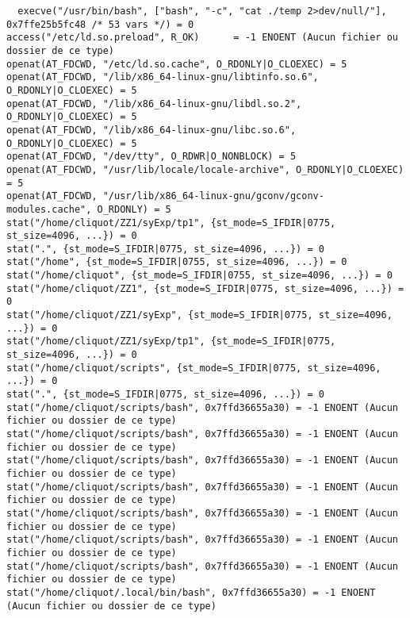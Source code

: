 \documentclass[11pt]{article}
\begin{document}
\begin{lstlisting}
  execve("/usr/bin/bash", ["bash", "-c", "cat ./temp 2>dev/null/"], 0x7ffe25b5fc48 /* 53 vars */) = 0
access("/etc/ld.so.preload", R_OK)      = -1 ENOENT (Aucun fichier ou dossier de ce type)
openat(AT_FDCWD, "/etc/ld.so.cache", O_RDONLY|O_CLOEXEC) = 5
openat(AT_FDCWD, "/lib/x86_64-linux-gnu/libtinfo.so.6", O_RDONLY|O_CLOEXEC) = 5
openat(AT_FDCWD, "/lib/x86_64-linux-gnu/libdl.so.2", O_RDONLY|O_CLOEXEC) = 5
openat(AT_FDCWD, "/lib/x86_64-linux-gnu/libc.so.6", O_RDONLY|O_CLOEXEC) = 5
openat(AT_FDCWD, "/dev/tty", O_RDWR|O_NONBLOCK) = 5
openat(AT_FDCWD, "/usr/lib/locale/locale-archive", O_RDONLY|O_CLOEXEC) = 5
openat(AT_FDCWD, "/usr/lib/x86_64-linux-gnu/gconv/gconv-modules.cache", O_RDONLY) = 5
stat("/home/cliquot/ZZ1/syExp/tp1", {st_mode=S_IFDIR|0775, st_size=4096, ...}) = 0
stat(".", {st_mode=S_IFDIR|0775, st_size=4096, ...}) = 0
stat("/home", {st_mode=S_IFDIR|0755, st_size=4096, ...}) = 0
stat("/home/cliquot", {st_mode=S_IFDIR|0755, st_size=4096, ...}) = 0
stat("/home/cliquot/ZZ1", {st_mode=S_IFDIR|0775, st_size=4096, ...}) = 0
stat("/home/cliquot/ZZ1/syExp", {st_mode=S_IFDIR|0775, st_size=4096, ...}) = 0
stat("/home/cliquot/ZZ1/syExp/tp1", {st_mode=S_IFDIR|0775, st_size=4096, ...}) = 0
stat("/home/cliquot/scripts", {st_mode=S_IFDIR|0775, st_size=4096, ...}) = 0
stat(".", {st_mode=S_IFDIR|0775, st_size=4096, ...}) = 0
stat("/home/cliquot/scripts/bash", 0x7ffd36655a30) = -1 ENOENT (Aucun fichier ou dossier de ce type)
stat("/home/cliquot/scripts/bash", 0x7ffd36655a30) = -1 ENOENT (Aucun fichier ou dossier de ce type)
stat("/home/cliquot/scripts/bash", 0x7ffd36655a30) = -1 ENOENT (Aucun fichier ou dossier de ce type)
stat("/home/cliquot/scripts/bash", 0x7ffd36655a30) = -1 ENOENT (Aucun fichier ou dossier de ce type)
stat("/home/cliquot/scripts/bash", 0x7ffd36655a30) = -1 ENOENT (Aucun fichier ou dossier de ce type)
stat("/home/cliquot/scripts/bash", 0x7ffd36655a30) = -1 ENOENT (Aucun fichier ou dossier de ce type)
stat("/home/cliquot/scripts/bash", 0x7ffd36655a30) = -1 ENOENT (Aucun fichier ou dossier de ce type)
stat("/home/cliquot/.local/bin/bash", 0x7ffd36655a30) = -1 ENOENT (Aucun fichier ou dossier de ce type)

\end{lstlisting}
\end{document}
